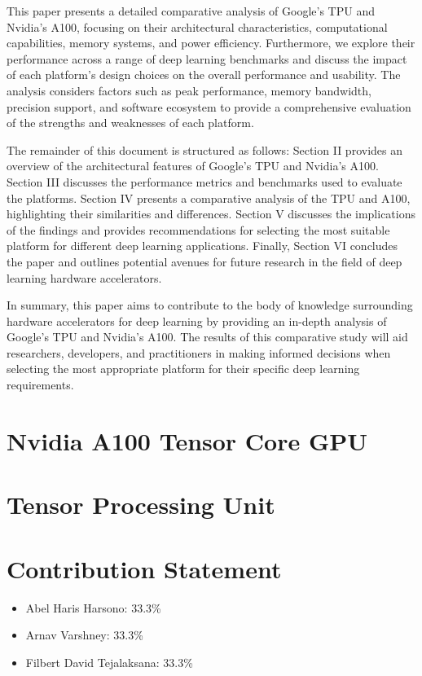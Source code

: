 \documentclass[conference]{IEEEtran}
\begin{document}
    This paper presents a detailed comparative analysis of Google's TPU and Nvidia's A100, focusing on their architectural characteristics, computational capabilities, memory systems, and power efficiency.
    Furthermore, we explore their performance across a range of deep learning benchmarks and discuss the impact of each platform's design choices on the overall performance and usability.
    The analysis considers factors such as peak performance, memory bandwidth, precision support, and software ecosystem to provide a comprehensive evaluation of the strengths and weaknesses of each platform.

    The remainder of this document is structured as follows: Section II provides an overview of the architectural features of Google's TPU and Nvidia's A100.
    Section III discusses the performance metrics and benchmarks used to evaluate the platforms.
    Section IV presents a comparative analysis of the TPU and A100, highlighting their similarities and differences.
    Section V discusses the implications of the findings and provides recommendations for selecting the most suitable platform for different deep learning applications.
    Finally, Section VI concludes the paper and outlines potential avenues for future research in the field of deep learning hardware accelerators.

    In summary, this paper aims to contribute to the body of knowledge surrounding hardware accelerators for deep learning by providing an in-depth analysis of Google's TPU and Nvidia's A100.
    The results of this comparative study will aid researchers, developers, and practitioners in making informed decisions when selecting the most appropriate platform for their specific deep learning requirements.


    \section{Nvidia A100 Tensor Core GPU}
    \label{sec:nvidia-a100-tensor-core-gpu}
    

    \section{Tensor Processing Unit}
    \label{sec:tensor-processing-unit}
    

    \section{Contribution Statement}
    \label{sec:contribution-statement}
    \begin{itemize}
        \item Abel Haris Harsono: 33.3\%
        \item Arnav Varshney: 33.3\%
        \item Filbert David Tejalaksana: 33.3\%
    \end{itemize}
\end{document}
